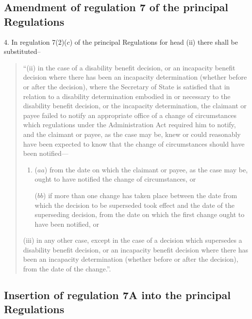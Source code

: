\documentclass[12pt,a4paper]{article}
\begin{document}
\subsection[4. Amendment of regulation 7 of the principal Regulations]{Amendment of regulation 7 of the principal Regulations}

4.  In regulation 7(2)($c$) of the principal Regulations for head (ii) there shall be substituted–
\begin{quotation}
“(ii) in the case of a disability benefit decision, or an incapacity benefit decision where there has been an incapacity determination (whether before or after the decision), where the Secretary of State is satisfied that in relation to a disability determination embodied in or necessary to the disability benefit decision, or the incapacity determination, the claimant or payee failed to notify an appropriate office of a change of circumstances which regulations under the Administration Act required him to notify, and the claimant or payee, as the case may be, knew or could reasonably have been expected to know that the change of circumstances should have been notified---
\begin{enumerate}\item[]
($aa$) from the date on which the claimant or payee, as the case may be, ought to have notified the change of circumstances, or

($bb$) if more than one change has taken place between the date from which the decision to be superseded took effect and the date of the superseding decision, from the date on which the first change ought to have been notified, or
\end{enumerate}

(iii) in any other case, except in the case of a decision which supersedes a disability benefit decision, or an incapacity benefit decision where there has been an incapacity determination (whether before or after the decision), from the date of the change.”.
\end{quotation}

\subsection[5. Insertion of regulation 7A into the principal Regulations]{Insertion of regulation 7A into the principal Regulations}
\end{document}
